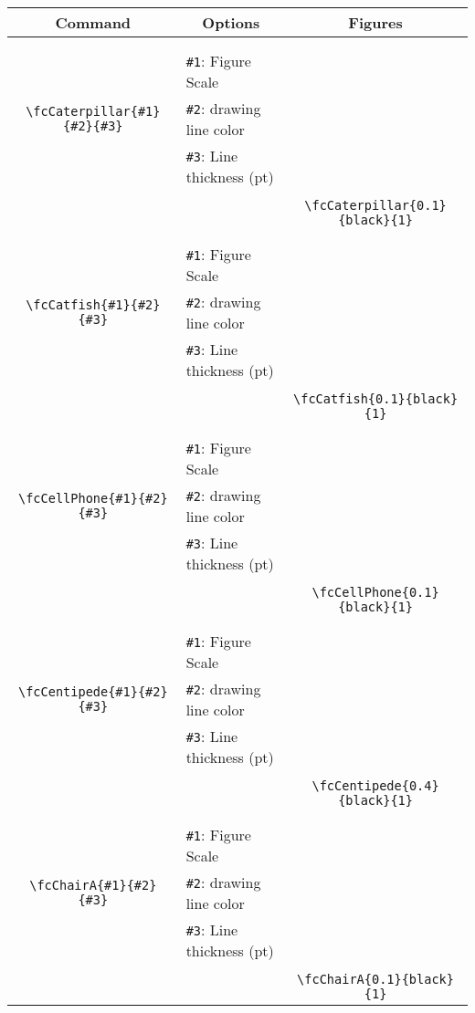 \documentclass[x11names]{article}
\begin{document}
\begin{table}[H]\centering\begin{tabular}{|c|l|c|}\hline {\bf Command}& \multicolumn{1}{c|}{{\bf Options}} & {\bf Figures}\\  \hline	&&\multirow{5}{*}{\fcCaterpillar{0.1}{black}{1}}\\	&&\\	&\verb|#1|: Figure Scale &\\	\verb|\fcCaterpillar{#1}{#2}{#3}|&	\verb|#2|: drawing line color &\\	&\verb|#3|: Line thickness (pt) &\\ &&\\&&	\verb|\fcCaterpillar{0.1}{black}{1}|\\\hline 	
	&&\multirow{5}{*}{\fcCatfish{0.1}{black}{1}}\\	&&\\	&\verb|#1|: Figure Scale &\\	\verb|\fcCatfish{#1}{#2}{#3}|&	\verb|#2|: drawing line color &\\	&\verb|#3|: Line thickness (pt) &\\ &&\\&&	\verb|\fcCatfish{0.1}{black}{1}|\\\hline 	
	&&\multirow{5}{*}{\fcCellPhone{0.1}{black}{1}}\\	&&\\	&\verb|#1|: Figure Scale &\\	\verb|\fcCellPhone{#1}{#2}{#3}|&	\verb|#2|: drawing line color &\\	&\verb|#3|: Line thickness (pt) &\\ &&\\&&	\verb|\fcCellPhone{0.1}{black}{1}|\\\hline 	
	&&\multirow{5}{*}{\fcCentipede{0.4}{black}{1}}\\	&&\\	&\verb|#1|: Figure Scale &\\	\verb|\fcCentipede{#1}{#2}{#3}|&	\verb|#2|: drawing line color &\\	&\verb|#3|: Line thickness (pt) &\\ &&\\&&	\verb|\fcCentipede{0.4}{black}{1}|\\\hline 	
	&&\multirow{5}{*}{\fcChairA{0.1}{black}{1}}\\	&&\\	&\verb|#1|: Figure Scale &\\	\verb|\fcChairA{#1}{#2}{#3}|&	\verb|#2|: drawing line color &\\	&\verb|#3|: Line thickness (pt) &\\ &&\\&&	\verb|\fcChairA{0.1}{black}{1}|\\\hline 	

\end{tabular}
\end{table}
\end{document}
